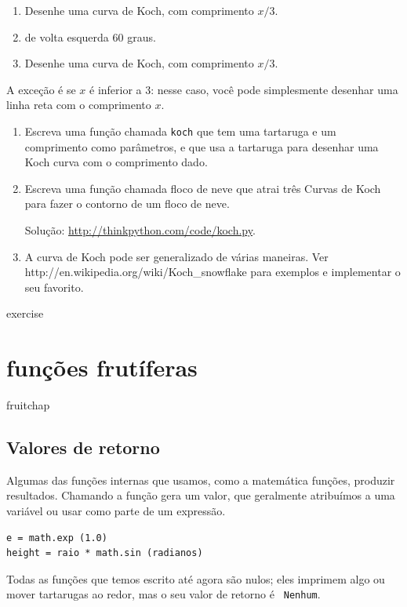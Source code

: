 \documentclass[10pt]{book}
\begin{document}
\begin{exercise}
{{\begin{}
\begin{enumerate}
\item Desenhe uma curva de Koch, com comprimento $ x / 3 $.

\item de volta esquerda 60 graus.

\item Desenhe uma curva de Koch, com comprimento $ x / 3 $.

\end{enumerate}

A exceção é se $ x $ é inferior a 3: nesse caso,
você pode simplesmente desenhar uma linha reta com o comprimento $ x $.

\begin{enumerate}

\item Escreva uma função chamada {\tt koch} que tem uma tartaruga e
um comprimento como parâmetros, e que usa a tartaruga para desenhar uma Koch
curva com o comprimento dado.

\item Escreva uma função chamada {\tt} floco de neve que atrai três
Curvas de Koch para fazer o contorno de um floco de neve.

Solução: \url{http://thinkpython.com/code/koch.py}.

\item A curva de Koch pode ser generalizado de várias maneiras. Ver
\url{} http://en.wikipedia.org/wiki/Koch_snowflake para exemplos e
implementar o seu favorito.

\end{enumerate}
\end{} exercise


\chapter{funções frutíferas}
\label{} fruitchap

\section{Valores de retorno}

Algumas das funções internas que usamos, como a matemática
funções, produzir resultados. Chamando a função gera um
valor, que geralmente atribuímos a uma variável ou usar como parte de um
expressão.

\begin{verbatim}
e = math.exp (1.0)
height = raio * math.sin (radianos)
\end{verbatim}
%
Todas as funções que temos escrito até agora são nulos; eles imprimem
algo ou mover tartarugas ao redor, mas o seu valor de retorno é {\tt
Nenhum}.

}}
\end{exercise}
\end{document}
